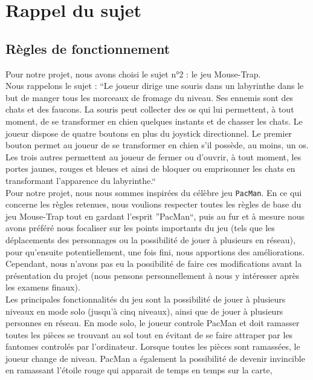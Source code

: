   \chapter*{Rappel du sujet}
   \setcounter{chapter}{1}
    
    \section{Règles de fonctionnement}
      Pour notre projet, nous avons choisi le sujet n°2 : le jeu Mouse-Trap. \\
      Nous rappelons le sujet : ``Le joueur dirige une souris dans un labyrinthe dans le but de manger tous les morceaux de fromage du niveau. Ses ennemis sont des chats et des faucons. La souris 
      peut collecter des os qui lui permettent, à tout moment, de se transformer en chien quelques instants et de chasser les chats. Le joueur dispose de quatre boutons en plus du joystick 
      directionnel. Le premier bouton permet au joueur de se transformer en chien s’il possède, au moins, un os. Les trois autres permettent au joueur de fermer ou d’ouvrir, à tout moment, 
      les portes jaunes, rouges et bleues et ainsi de bloquer ou emprisonner les chats en transformant l’apparence du labyrinthe.``\\
      Pour notre projet, nous nous sommes inspirées du célèbre jeu \texttt{PacMan}. En ce qui concerne les règles retenues, nous voulions respecter toutes les règles de base du jeu Mouse-Trap tout
      en gardant l'esprit ''PacMan``, puis au fur et à mesure nous avons préféré nous focaliser sur les points importants du jeu (tels que les déplacements des personnages ou la possibilité
      de jouer à plusieurs en réseau), pour qu'ensuite potentiellement, une fois fini, nous apportions des améliorations.
      Cependant, nous n'avons pas eu la possibilité de faire ces modifications avant la présentation du projet (nous pensons personnellement à nous y intéresser après les examens finaux).\\
      Les principales fonctionnalités du jeu sont la possibilité de jouer à plusieurs niveaux en mode solo (jusqu'à cinq niveaux), ainsi que de jouer à plusieurs personnes en réseau.
      En mode solo, le joueur controle PacMan et doit ramasser toutes les pièces se trouvant au sol tout en évitant de se faire attraper par les fantomes controlés par l'ordinateur. Lorsque 
      toutes les pièces sont ramassées, le joueur change de niveau. PacMan a également la possibilité de devenir invincible en ramassant l'étoile rouge qui apparait de temps en temps sur la carte, 
